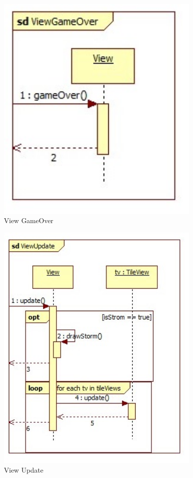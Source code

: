 \begin{figure}[H]
	\begin{center}
		\includegraphics[width=10cm]{chapters/chapter11/seq/View_GameOver.jpg}
		\caption{View GameOver}
		\label{View GameOver}
	\end{center}
\end{figure}
\begin{figure}[H]
	\begin{center}
		\includegraphics[width=10cm]{chapters/chapter11/seq/View_Update.jpg}
		\caption{View Update}
		\label{View Update}
	\end{center}
\end{figure}
